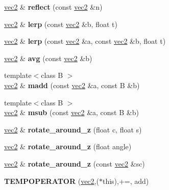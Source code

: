 \begin{DoxyCompactItemize}
\hyperlink{structvec2}{vec2} \& {\bfseries reflect} (const \hyperlink{structvec2}{vec2} \&n)
\item 
\mbox{\label{structvec2_a9e0af44948a5c8f8e78ccac6b59031fc}} 
\hyperlink{structvec2}{vec2} \& {\bfseries lerp} (const \hyperlink{structvec2}{vec2} \&b, float t)
\item 
\mbox{\label{structvec2_aa140a02d1a543346eb930ec90538338d}} 
\hyperlink{structvec2}{vec2} \& {\bfseries lerp} (const \hyperlink{structvec2}{vec2} \&a, const \hyperlink{structvec2}{vec2} \&b, float t)
\item 
\mbox{\label{structvec2_a6853f6577ac81232b46d94fdba0065ed}} 
\hyperlink{structvec2}{vec2} \& {\bfseries avg} (const \hyperlink{structvec2}{vec2} \&b)
\item 
\mbox{\label{structvec2_a7537cc90ff6a24955df27dc4fe97c58d}} 
{\footnotesize template$<$class B $>$ }\\\hyperlink{structvec2}{vec2} \& {\bfseries madd} (const \hyperlink{structvec2}{vec2} \&a, const B \&b)
\item 
\mbox{\label{structvec2_a46e79101eab9f63ffca140a960f77e91}} 
{\footnotesize template$<$class B $>$ }\\\hyperlink{structvec2}{vec2} \& {\bfseries msub} (const \hyperlink{structvec2}{vec2} \&a, const B \&b)
\item 
\mbox{\label{structvec2_a25fad7c95d0fc97ab225045168cf1932}} 
\hyperlink{structvec2}{vec2} \& {\bfseries rotate\+\_\+around\+\_\+z} (float c, float s)
\item 
\mbox{\label{structvec2_a2f2280eb3f550b85f63883d4890aa909}} 
\hyperlink{structvec2}{vec2} \& {\bfseries rotate\+\_\+around\+\_\+z} (float angle)
\item 
\mbox{\label{structvec2_a5581f972f475fc0c488a3b212b48f9ed}} 
\hyperlink{structvec2}{vec2} \& {\bfseries rotate\+\_\+around\+\_\+z} (const \hyperlink{structvec2}{vec2} \&sc)
\item 
\mbox{\label{structvec2_a08037aa8d7e60ba1b323e844533e4f7c}} 
{\bfseries T\+E\+M\+P\+O\+P\+E\+R\+A\+T\+OR} (\hyperlink{structvec2}{vec2},($\ast$this),+=, add)

\end{DoxyCompactItemize}
